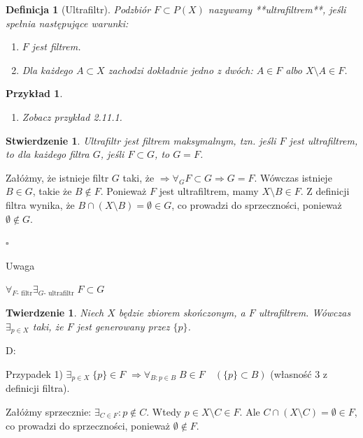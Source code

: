 \documentclass[12pt,a4paper]{article}
\newcounter{twierdzenie}
\theoremstyle{break}
\newtheorem{definition}{Definicja}[section]
\newtheorem{theorem}{Twierdzenie}[section]
\newtheorem{example}{Przykład}[section]
\newtheorem{stwierdzenie}{Stwierdzenie}[section]
\begin{document}
			\begin{definition}[Ultrafiltr]
				Podzbiór $F \subset P(X)$ nazywamy **ultrafiltrem**, jeśli spełnia następujące warunki:
				\begin{enumerate}[1)]
					\item $F$ jest filtrem.
					\item Dla każdego $A \subset X$ zachodzi dokładnie jedno z dwóch: $A \in F$ albo $X \setminus A \in F$.
				\end{enumerate}
			\end{definition}
			
			\begin{example}
				\begin{enumerate}[1.]
					\item Zobacz przykład 2.11.1.
				\end{enumerate}
			\end{example}
			
			\begin{stwierdzenie}
				Ultrafiltr jest filtrem maksymalnym, tzn. jeśli $F$ jest ultrafiltrem, to dla każdego filtra $G$, jeśli $F \subset G$, to $G = F$.
			\end{stwierdzenie}
			
				Załóżmy, że istnieje filtr $G$ taki, że $\Rightarrow \forall_G F\subset G \Rightarrow G=F$. Wówczas istnieje $B \in G$, takie że $B \notin F$. Ponieważ $F$ jest ultrafiltrem, mamy $X \setminus B \in F$.  
				Z definicji filtra wynika, że $B \cap (X \setminus B) = \emptyset \in G$, co prowadzi do sprzeczności, ponieważ $\emptyset \notin G$.
			
	\begin{flushright}$\square$\end{flushright}
	Uwaga
	
	$\forall_{F \text{- filtr}} \exists_{G \text{- ultrafiltr}} \; F \subset G$
	
	\begin{theorem}
		Niech $X$ będzie zbiorem skończonym, a $F$ ultrafiltrem. Wówczas $\exists_{p \in X}$ taki, że $F$ jest generowany przez $\{p\}$.
	\end{theorem}
	
	D: 
	
	Przypadek 1) $\exists_{p \in X} \; \{p\} \in F$  
	$\Rightarrow \forall_{B : p \in B} \; B \in F \quad (\{p\} \subset B)$ (własność 3 z definicji filtra).  
	
	Załóżmy sprzecznie: $\exists_{C \in F} : p \notin C$.  
	Wtedy $p \in X \setminus C \in F$.  
	Ale $C \cap (X \setminus C) = \emptyset \in F$, co prowadzi do sprzeczności, ponieważ $\emptyset \notin F$.
	
\end{document}
